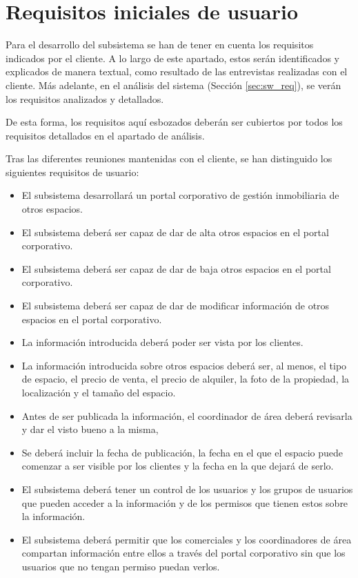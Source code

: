 \section{Requisitos iniciales de usuario}\label{sec:user_req}
\par Para el desarrollo del subsistema se han de tener en cuenta los requisitos indicados por el cliente. A lo largo de este apartado, estos serán identificados y explicados de manera textual, como resultado de las entrevistas realizadas con el cliente. Más adelante, en el análisis del sistema (Sección \ref{sec:sw_req}), se verán los requisitos analizados y detallados.

\par De esta forma, los requisitos aquí esbozados deberán ser cubiertos por todos los requisitos detallados en el apartado de análisis.

\par Tras las diferentes reuniones mantenidas con el cliente, se han distinguido los siguientes requisitos de usuario:


\begin{itemize}[-]
    \item El subsistema desarrollará un portal corporativo de gestión inmobiliaria de otros espacios.
    \item El subsistema deberá ser capaz de dar de alta otros espacios en el portal corporativo.
    \item El subsistema deberá ser capaz de dar de baja otros espacios en el portal corporativo.
    \item El subsistema deberá ser capaz de dar de modificar información de otros espacios en el portal corporativo.
    \item La información introducida deberá poder ser vista por los clientes.
    \item La información introducida sobre otros espacios deberá ser, al menos, el tipo de espacio, el precio de venta, el  precio de alquiler, la foto de la propiedad, la localización y el tamaño del espacio.
    \item Antes de ser publicada la información, el coordinador de área deberá revisarla y dar el visto bueno a la misma,
    \item Se deberá incluir la fecha de publicación, la fecha en el que el espacio puede comenzar a ser visible por los clientes y la fecha en la que dejará de serlo.
    \item El subsistema deberá tener un control de los usuarios y los grupos de usuarios que pueden acceder a la información y de los permisos que tienen estos sobre la información.
    \item El subsistema deberá permitir que los comerciales y los coordinadores de área compartan información entre ellos a través del portal corporativo sin que los usuarios que no tengan permiso puedan verlos.
\end{itemize}
